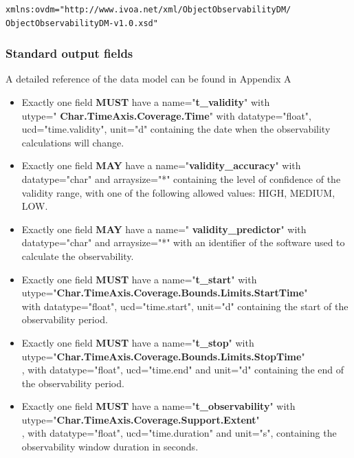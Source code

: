 \documentclass[11pt,a4paper]{ivoatex/ivoa}
\begin{document}
\begin{lstlisting}[language=XML]
xmlns:ovdm="http://www.ivoa.net/xml/ObjectObservabilityDM/
ObjectObservabilityDM-v1.0.xsd"
\end{lstlisting}

\subsubsection{Standard output fields}
A detailed reference of the data model can be found in Appendix A

\begin{itemize}
\item {Exactly one field \textbf{MUST} have a name="\textbf{t\_validity}"
with\\ utype=" \textbf{Char.TimeAxis.Coverage.Time}" with
datatype="float", ucd="time.validity", unit="d" containing the date when the observability calculations will change.}

\item {Exactly one field \textbf{MAY} have a name="\textbf{validity\_accuracy}" 
with datatype="char" and arraysize="*" containing the level of
confidence of the validity range, with one of the following allowed
values: HIGH, MEDIUM, LOW.}

\item {Exactly one field \textbf{MAY} have a name="\textbf{
validity\_predictor}" with datatype="char" and arraysize="*" with an
identifier of the software used to calculate the observability.}

\item {Exactly one field \textbf{MUST} have a name="\textbf{t\_start}" with\\
utype="\textbf{Char.TimeAxis.Coverage.Bounds.Limits.StartTime}"\\ with
datatype="float",  ucd="time.start", unit="d" containing the start of the observability period.}

\item {Exactly one field \textbf{MUST} have a name="\textbf{t\_stop}" with\\
utype="\textbf{Char.TimeAxis.Coverage.Bounds.Limits.StopTime}"\\, with
datatype="float", ucd="time.end" and unit="d" containing the end of the observability period.}

\item {Exactly one field \textbf{MUST} have a name="\textbf{t\_observability}"
with\\ utype="\textbf{Char.TimeAxis.Coverage.Support.Extent}"\\, with
datatype="float", ucd="time.duration" and unit="s", containing the observability window duration in seconds.}


\end{itemize}
\end{document}
